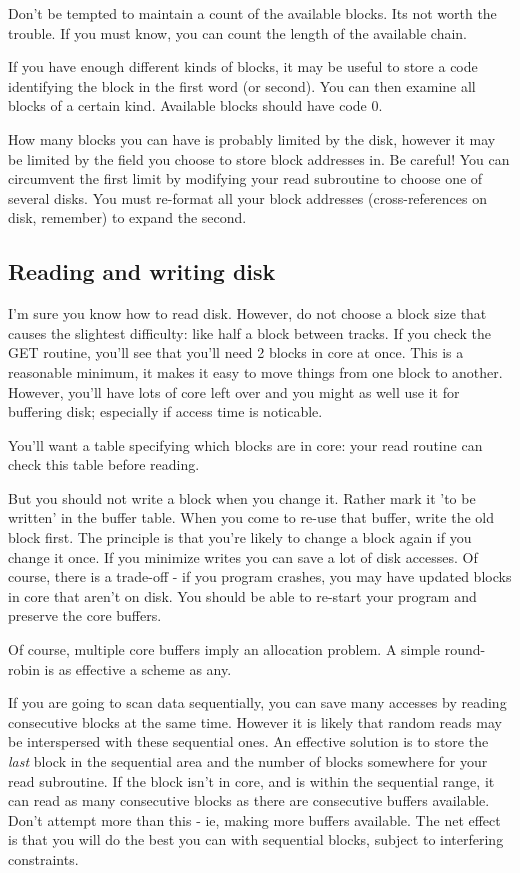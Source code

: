 \documentclass[b5paper, oneside]{book}
\begin{document}
Don't be tempted to maintain a count of the available blocks. Its not worth the trouble. If you must know, you can count the length of the available chain.

If you have enough different kinds of blocks, it may be useful to store a code identifying the block in the first word (or second). You can then examine all blocks of a certain kind. Available blocks should have code 0.

How many blocks you can have is probably limited by the disk, however it may be limited by the field you choose to store block addresses in. Be careful! You can circumvent the first limit by modifying your read subroutine to choose one of several disks. You must re-format all your block addresses (cross-references on disk, remember) to expand the second.

\subsection{Reading and writing disk}
I'm sure you know how to read disk. However, do not choose a block size that causes the slightest difficulty: like half a block between tracks. If you check the GET routine, you'll see that you'll need 2 blocks in core at once. This is a reasonable minimum, it makes it easy to move things from one block to another. However, you'll have lots of core left over and you might as well use it for buffering disk; especially if access time is noticable.

You'll want a table specifying which blocks are in core: your read routine can check this table before reading.

But you should not write a block when you change it. Rather mark it 'to be written' in the buffer table. When you come to re-use that buffer, write the old block first. The principle is that you're likely to change a block again if you change it once. If you minimize writes you can save a lot of disk accesses. Of course, there is a trade-off - if you program crashes, you may have updated blocks in core that aren't on disk. You should be able to re-start your program and preserve the core buffers.

Of course, multiple core buffers imply an allocation problem. A simple round-robin is as effective a scheme as any.

If you are going to scan data sequentially, you can save many accesses by reading consecutive blocks at the same time. However it is likely that random reads may be interspersed with these sequential ones. An effective solution is to store the {\em last} block in the sequential area and the number of blocks somewhere for your read subroutine. If the block isn't in core, and is within the sequential range, it can read as many consecutive blocks as there are consecutive buffers available. Don't attempt more than this - ie, making more buffers available. The net effect is that you will do the best you can with sequential blocks, subject to interfering constraints.
\end{document}
